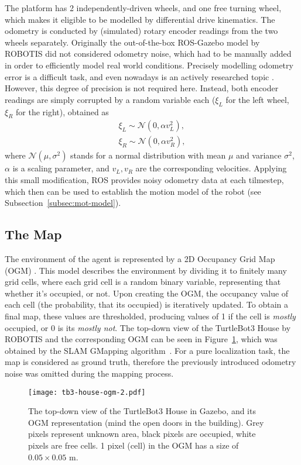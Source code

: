 The platform has 2 independently-driven wheels, and one free turning wheel, which
makes it eligible to be modelled by differential drive kinematics.
The odometry is conducted by (simulated) rotary encoder readings from the two wheels separately.
Originally the out-of-the-box ROS-Gazebo model by ROBOTIS did not considered odometry noise,
which had to be manually added in order to efficiently model real world conditions.
Precisely modelling odometry error is a difficult task, and even nowadays is an actively researched topic \cite{Fazekas2021}.
However, this degree of precision is not required here.
Instead, both encoder readings are simply corrupted by a random variable each  ($\xi_L$ for the left wheel, $\xi_R$ for the right), obtained as
\begin{align}
    \xi_L \sim \mathcal{N}(0,\alpha v_L^{2}), \\
    \xi_R \sim \mathcal{N}(0,\alpha v_R^{2}),
\end{align}
where $\mathcal{N}(\mu,\sigma^{2})$ stands for a normal distribution with mean $\mu$ and variance $\sigma^{2}$,
$\alpha$ is a scaling parameter, and $v_L, v_R$ are the corresponding velocities. Applying this small modification,
ROS provides noisy odometry data at each tilmestep, which then can be used to establish the motion model of the robot (see Subsection~\ref{subsec:mot-model}).

\subsection{The Map}
The environment of the agent is represented by a 2D Occupancy Grid Map (OGM) \cite{Moravec1985}.
This model describes the environment by dividing it to finitely many grid cells, where each grid cell is a random binary variable,
representing that whether it’s occupied, or not.
Upon creating the OGM, the occupancy value of each cell (the probability, that its occupied) is iteratively updated.
To obtain a final map, these values are thresholded, producing values of 1 if the cell is \emph{mostly} occupied,
or 0 is its \emph{mostly not}.
The top-down view of the TurtleBot3 House by ROBOTIS and the corresponding OGM can be seen in Figure~\ref{fig:tb3-house-ogm},
which was obtained by the SLAM GMapping algorithm~\cite{Grisetti2007}.
For a pure localization task, the map is considered as ground truth,
therefore the previously introduced odometry noise was omitted during the mapping process.
\begin{figure}[htbp]
    \centering
    \texttt{[image: tb3-house-ogm-2.pdf]}
    \caption{The top-down view of the TurtleBot3 House in Gazebo, and its OGM representation (mind the open doors in the building).
        Grey pixels represent unknown area, black pixels are occupied, white pixels are free cells.
        1 pixel (cell) in the OGM has a size of $0.05 \times 0.05$ m. }
    \label{fig:tb3-house-ogm}
\end{figure}
